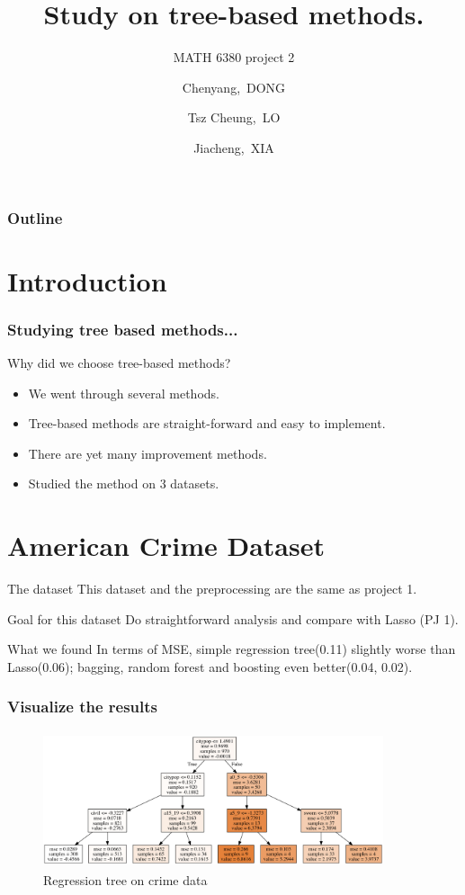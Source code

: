 \documentclass{beamer}
\title[MATH 6380 Project 2]{Study on tree-based methods.}
\subtitle{MATH 6380 project 2}
\author[C.Dong, T.C.LO, J.Xia]
{Chenyang,~DONG \and Tsz Cheung,~LO \and Jiacheng,~XIA}
\begin{document}
\frame{\titlepage}

\begin{frame}
\frametitle{Outline}
\tableofcontents
\end{frame}

\section{Introduction}
\begin{frame}
\frametitle{Studying tree based methods...}
Why did we choose tree-based methods?
\pause
\begin{itemize}
\item We went through several methods.
\pause
\item Tree-based methods are straight-forward and easy to implement.
\pause
\item There are yet many improvement methods.
\pause
\item Studied the method on 3 datasets.
\end{itemize}
\end{frame}

\section{American Crime Dataset}
\begin{frame}
\begin{block}{The dataset}
This dataset and the preprocessing are the same as project 1.
\end{block}
\pause
\begin{exampleblock}{Goal for this dataset}
Do straightforward analysis and compare with Lasso (PJ 1).
\end{exampleblock}
\begin{alertblock}{What we found}
In terms of MSE, simple regression tree(0.11) slightly worse than Lasso(0.06); bagging, random forest and boosting even better(0.04, 0.02).
\end{alertblock}
\end{frame}

\begin{frame}
\frametitle{Visualize the results}
\begin{figure}[h]
  \centering
  \includegraphics[width=10cm, height=4cm]{crime_treetu}
  \caption{Regression tree on crime data}
\end{figure}
\end{frame}
\end{document}
